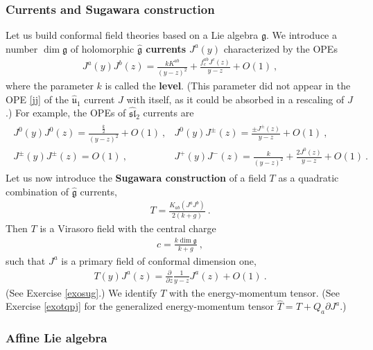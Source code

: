 \documentclass[12pt, a4paper, notitlepage, twoside]{report}
\numberwithin{equation}{section}
\theoremstyle{break}
\begin{document}
\subsubsection{Currents and Sugawara construction}

Let us build conformal field theories based on a Lie algebra $\mathfrak{g}$. 
We introduce a number $\dim \mathfrak{g}$ of holomorphic \textbf{\boldmath $\hat{\mathfrak{g}}$ currents} $J^a(y)$ characterized by the OPEs 
\begin{align}
 \boxed{ J^a(y) J^b(z) = \frac{k K^{ab}}{(y-z)^2} +  \frac{ f^{ab}_c J^c(z)}{y-z}  + O(1)} \ ,
\label{jajb}
\end{align}
where the parameter $k$ is called the \textbf{level}. (This parameter did not appear in the OPE \eqref{jj} of the $\hat{\mathfrak{u}}_1$ current $J$ with itself, as it could be absorbed in a rescaling of $J$.) For example, the OPEs of $\widehat{\mathfrak{sl}}_2$ currents are
\begin{align}
\begin{array}{ll}
  J^0(y)J^0(z) = \frac{\frac{k}{2}}{(y-z)^2} + O(1)\ ,  & J^0(y)J^\pm(z) = \frac{\pm J^\pm(z)}{y-z} + O(1)\ ,
\\
 J^\pm(y)J^\pm(z) = O(1) \ , & J^+(y)J^-(z) = \frac{k}{(y-z)^2} + \frac{2J^0(z)}{y-z} + O(1)\ .
\end{array}
\label{jjjj}
\end{align}
Let us now introduce the \textbf{\boldmath Sugawara construction} of a field $T$ as a quadratic combination of $\hat{\mathfrak{g}}$ currents,
\begin{align}
\boxed{ T =  \frac{ K_{ab} (J^aJ^b)}{2(k+g)} } \ .
\label{tjj} 
\end{align}
Then $T$ is a Virasoro field with the central charge 
\begin{align}
 \boxed{ c = \frac{ k \dim \mathfrak{g}}{k+g} }\ ,
\label{ckg}
\end{align}
such that $J^a$ is a primary field of conformal dimension one, 
\begin{align}
\boxed{ T(y)J^a(z) = {\frac{\partial}{\partial z}} \frac{1}{y-z} J^a(z) + O(1)} \ .
\label{tja}
\end{align}
(See Exercise \ref{exosug}.)
We identify $T$ with the energy-momentum tensor.
(See Exercise \ref{exotqpj} for the generalized energy-momentum tensor $\hat{T} = T + Q_a\partial J^a$.)

\subsubsection{Affine Lie algebra}
\end{document}
